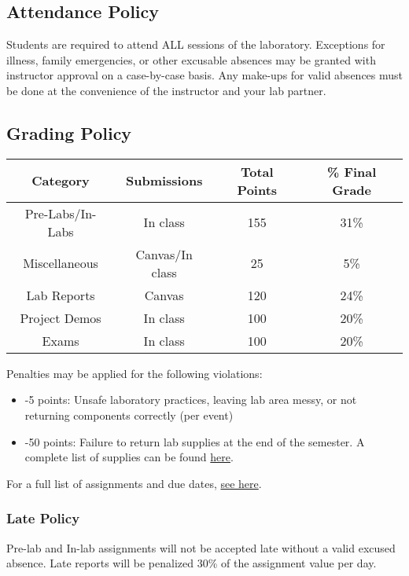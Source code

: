 \documentclass{article}
\begin{document}
\subsection*{Attendance Policy}
Students are required to attend ALL sessions of the laboratory. Exceptions for illness, family emergencies, or other excusable absences may be granted with instructor approval on a case-by-case basis. Any make-ups for valid absences must be done at the convenience of the instructor and your lab partner.

\subsection*{Grading Policy}

\begin{table}[h!]
	\centering
\begin{tabular}[h!]{cccc}
\toprule
	Category & Submissions & Total Points & \% Final Grade\\
	\midrule
	Pre-Labs/In-Labs & In class & 155 & 31\%\\
	Miscellaneous & Canvas/In class & 25 & 5\%\\
	Lab Reports & Canvas & 120 & 24\%\\
	Project Demos & In class & 100 & 20\%\\
	Exams & In class & 100 & 20\%\\
	\bottomrule
\end{tabular}
\end{table}

Penalties may be applied for the following violations:
\begin{itemize}
	\item -5 points: Unsafe laboratory practices, leaving lab area messy, or not returning components correctly (per event)
	\item -50 points: Failure to return lab supplies at the end of the semester. A complete list of supplies can be found \href{https://jameslong12.github.io/BIOE_385/general_course_materials/supplies.pdf}{here}.
\end{itemize}

For a full list of assignments and due dates, \href{https://jameslong12.github.io/BIOE_385/general_course_materials/assignments.pdf}{see here}.

\subsubsection*{Late Policy}
Pre-lab and In-lab assignments will not be accepted late without a valid excused absence. Late reports will be penalized 30\% of the assignment value per day.
\end{document}
